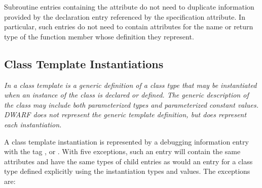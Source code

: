 Subroutine entries containing the
 attribute 
do not need to duplicate information provided
by the declaration entry referenced by the specification
attribute. In particular, such entries do not need to contain
attributes for the name or return type of the function member
whose definition they represent.

\subsection{Class Template Instantiations}
\label{chap:classtemplateinstantiations}

\textit{In  a class template is a generic definition of a class
type that may be instantiated when an instance of the class
is declared or defined. The generic description of the
class may include both parameterized types and parameterized
constant values. DWARF does not represent the generic template
definition, but does represent each instantiation.}

A class template instantiation is represented by a
debugging information entry with the tag ,
 or 
. With five
exceptions, such an entry will contain the same attributes
and have the same types of child entries as would an entry
for a class type defined explicitly using the instantiation
types and values. The exceptions are:

